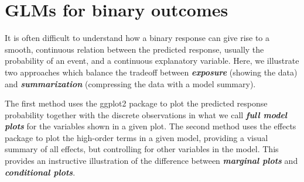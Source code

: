 \documentclass{article}
\newcommand{\pkg}[1]{\textsf{#1}}
\newcommand{\Rpackage}[1]{\pkg{#1} package}
\newcommand{\glossterm}[1]{\textit{\textbf{#1}}}
\begin{document}





\section*{GLMs for binary outcomes}


It is often difficult to understand how a binary response can give rise to
a smooth, continuous relation between the predicted response, usually
the probability of an event, and a continuous explanatory variable.
Here, we illustrate two approaches which balance the tradeoff between
\glossterm{exposure} (showing the data) and \glossterm{summarization} (compressing the data with a model summary).

The first method uses the \Rpackage{ggplot2} to plot the predicted
response probability together with the discrete observations in what
we call \glossterm{full model plots} for the variables shown in a
given plot.
The second method uses the \Rpackage{effects} to plot the high-order
terms in a given model, providing a visual summary of all effects,
but controlling for other variables in the model.  This provides an
instructive illustration of the difference between \glossterm{marginal plots} and
\glossterm{conditional plots}.

\end{document}
